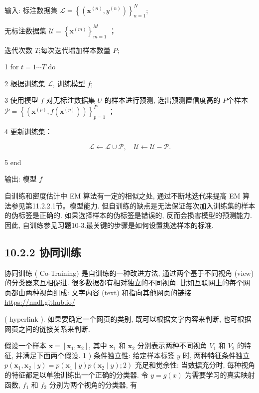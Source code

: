 \documentclass[10pt]{article}
\begin{document}
输入: 标注数据集 $\mathcal{L}=\left\{\left(\boldsymbol{x}^{(n)}, y^{(n)}\right)\right\}_{n=1}^{N}$;

无标注数据集 $\mathcal{U}=\left\{\boldsymbol{x}^{(m)}\right\}_{m=1}^{M}$ ；

迭代次数 $T$;每次迭代增加样本数量 $P$;

1 for $t=1 \cdots T$ do

2 根据训练集 $\mathcal{L}$, 训练模型 $f$;

3 使用模型 $f$ 对无标注数据集 $U$ 的样本进行预测, 选出预测置信度高的 $P$个样本 $\mathcal{P}=\left\{\left(\boldsymbol{x}^{(p)}, f\left(\boldsymbol{x}^{(p)}\right)\right)\right\}_{p=1}^{P}$ ；

4 更新训练集：

$$
\mathcal{L} \leftarrow \mathcal{L} \cup \mathcal{P}, \quad \mathcal{U} \leftarrow \mathcal{U}-\mathcal{P} .
$$

5 end

输出: 模型 $f$

自训练和密度估计中 EM 算法有一定的相似之处, 通过不断地迭代来提高 EM 算法参见第11.2.2.1节。模型能力. 但自训练的缺点是无法保证每次加入训练集的样本的伪标签是正确的. 如果选择样本的伪标签是错误的, 反而会损害模型的预测能力. 因此, 自训练参见习题10-3.最关键的步骤是如何设置挑选样本的标准.

\subsection*{10.2.2 协同训练}
协同训练 ( Co-Training) 是自训练的一种改进方法, 通过两个基于不同视角 (view) 的分类器来互相促进. 很多数据都有相对独立的不同视角. 比如互联网上的每个网页都由两种视角组成: 文字内容 (text) 和指向其他网页的链接 \href{https://nndl.github.io/}{https://nndl.github.io/}

( hyperlink ). 如果要确定一个网页的类别, 既可以根据文字内容来判断, 也可根据网页之间的链接关系来判断.

假设一个样本 $\boldsymbol{x}=\left[\boldsymbol{x}_{1}, \boldsymbol{x}_{2}\right]$, 其中 $\boldsymbol{x}_{1}$ 和 $\boldsymbol{x}_{2}$ 分别表示两种不同视角 $V_{1}$ 和 $V_{2}$ 的特征, 并满足下面两个假设. 1 ) 条件独立性: 给定样本标签 $y$ 时, 两种特征条件独立 $\left.p\left(\boldsymbol{x}_{1}, \boldsymbol{x}_{2} \mid y\right)=p\left(\boldsymbol{x}_{1} \mid y\right) p\left(\boldsymbol{x}_{2} \mid y\right) ; 2\right)$ 充足和觉余性: 当数据充分时, 每种视角的特征都足以单独训练出一个正确的分类器. 令 $y=g(x)$ 为需要学习的真实映射函数, $f_{1}$ 和 $f_{2}$ 分别为两个视角的分类器, 有
\end{document}
